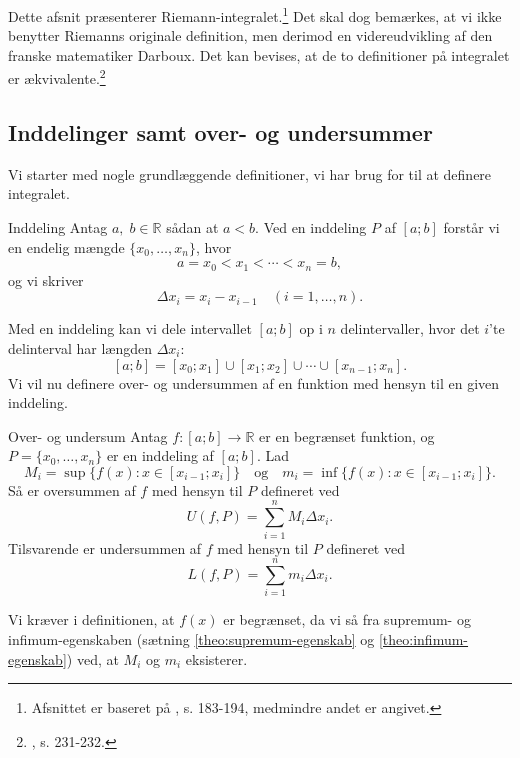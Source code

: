 Dette afsnit præsenterer Riemann-integralet.\footnote{Afsnittet er baseret på \cite{Abbott2002}, s. 183-194, medmindre andet er angivet.}
Det skal dog bemærkes, at vi ikke benytter Riemanns originale definition, men derimod en videreudvikling af den franske matematiker Darboux.
Det kan bevises, at de to definitioner på integralet er ækvivalente.\footnote{\cite{Bartle2010}, s. 231-232.}

\subsection{Inddelinger samt over- og undersummer}%
  \label{sub:Inddelinger samt over- og undersummer}

Vi starter med nogle grundlæggende definitioner, vi har brug for til at definere integralet.
\begin{definition}[label=def:inddeling]{Inddeling}{}
  Antag $a,\;b \in \mathbb{R}$ sådan at $a <b$.
  Ved en inddeling $P$ af $[a;b]$ forstår vi en endelig mængde $\{x_0,\dotsc, x_n\}$, hvor
  \[
  a=x_0<x_1<\cdots<x_n=b,
  \] 
  og vi skriver 
  \[
  \Delta x_i=x_i-x_{i-1} \quad (i=1,\ldots ,n).
  \]  
\end{definition}
Med en inddeling kan vi dele intervallet $[a;b]$ op i $n$ delintervaller, hvor det $i$'te delinterval har længden $\Delta x_i$:
\[
[a;b]=[x_0;x_1] \cup [x_1;x_2]\cup \cdots \cup [x _{n-1};x_n].
\] 
Vi vil nu definere over- og undersummen af en funktion med hensyn til en given inddeling.

\begin{definition}[label=def:oversum]{Over- og undersum}{}
  Antag $f:[a;b] \to \mathbb{R}$ er en begrænset funktion, og $P=\{x_0,\ldots, x_n\}$ er en inddeling af $[a;b]$. 
  Lad 
  \[
  M_i=\sup \{ f(x):x \in [x _{i-1};x_i] \} \quad{\text{og}} \quad m_i=\inf \{ f(x):x \in [x _{i-1};x_i] \}.
  \] 
  Så er oversummen af $f$ med hensyn til $P$ defineret ved
  \[
  U(f, P)=\sum_{i=1}^{n} M_i \Delta x_i.
  \] 
  Tilsvarende er undersummen af $f$ med hensyn til $P$ defineret ved
  \[
  L(f, P)=\sum_{i=1}^{n} m_i \Delta x_i.
  \] 
\end{definition}

Vi kræver i definitionen, at $f(x)$ er begrænset, da vi så fra supremum- og infimum-egenskaben (sætning \ref{theo:supremum-egenskab} og \ref{theo:infimum-egenskab}) ved, at $M_i$ og $m_i$ eksisterer. 

